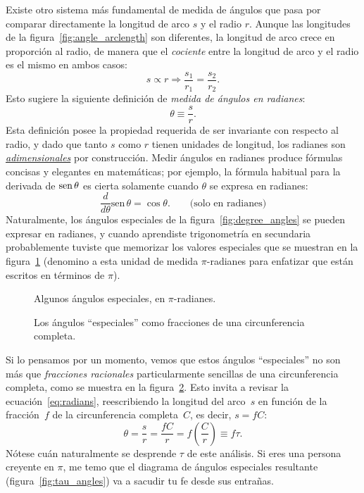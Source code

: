 Existe otro sistema más fundamental de medida de ángulos que pasa por comparar directamente la longitud de arco $s$ y el radio $r$. Aunque las longitudes de la figura~\ref{fig:angle_arclength} son diferentes, la longitud de arco crece en proporción al radio, de manera que el \emph{cociente} entre la longitud de arco y el radio es el mismo en ambos casos:
\[
s\propto r \Rightarrow \frac{s_1}{r_1} = \frac{s_2}{r_2}.
\]
Esto sugiere la siguiente definición de  \emph{medida de ángulos en radianes}:
\begin{equation}
\label{eq:radians}
\theta \equiv \frac{s}{r}.
\end{equation}
Esta definición posee la propiedad requerida de ser invariante con respecto al radio, y dado que tanto $s$ como $r$ tienen unidades de longitud, los radianes son \href{https://es.wikipedia.org/wiki/Magnitud_adimensional}{\emph{adimensionales}} por construcción. Medir ángulos en radianes produce fórmulas concisas y elegantes en matemáticas; por ejemplo, la fórmula habitual para la derivada de  $\mbox{sen}\,\theta$ es cierta solamente cuando $\theta$ se expresa en radianes:
\[
  \frac{d}{d\theta}\mbox{sen}\,\theta = \cos\theta. \qquad\mbox{(solo en radianes)}
\]
Naturalmente, los ángulos especiales de la figura~\ref{fig:degree_angles} se pueden expresar en radianes, y cuando aprendiste trigonometría en secundaria probablemente tuviste que memorizar los valores especiales que se muestran en la figura~\ref{fig:pi_angles} (denomino a esta unidad de medida $\pi$-radianes para enfatizar que están escritos en términos de $\pi$).

\begin{figure}
\begin{center}
\end{center}
\caption{Algunos ángulos especiales, en $\pi$-radianes.\label{fig:pi_angles}}
\end{figure}

\begin{figure}
\begin{center}
\end{center}
\caption{Los ángulos ``especiales'' como fracciones de una circunferencia completa.\label{fig:angle_fractions}}
\end{figure}

Si lo pensamos por un momento, vemos que estos ángulos ``especiales'' no son más que \emph{fracciones racionales} particularmente sencillas de una circunferencia completa, como se muestra en la figura~\ref{fig:angle_fractions}. Esto invita a revisar la ecuación~\eqref{eq:radians}, reescribiendo la longitud del arco~$s$ en función de la fracción~$f$ de la circunferencia completa~$C$, es decir, $s = f C$:
\begin{equation}
\label{eq:circle_fraction}
\theta = \frac{s}{r} = \frac{fC}{r} =  f\left(\frac{C}{r}\right) \equiv f\tau.
\end{equation}
Nótese cuán naturalmente se desprende $\tau$ de este análisis. Si eres una persona creyente en $\pi$, me temo que el diagrama  de ángulos especiales resultante (figura~\ref{fig:tau_angles}) va a sacudir tu fe desde sus entrañas.

